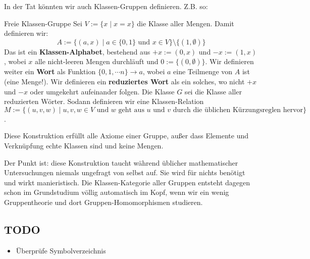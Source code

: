 \documentclass[a4paper]{amsart}
\theoremstyle{definition}
\begin{document}
In der Tat könnten wir auch Klassen-Gruppen definieren. Z.B. so:
\begin{Definition}{Freie Klassen-Gruppe}
   Sei $V := \{ x \mid x = x \}$ die Klasse aller Mengen. Damit definieren wir:
   \begin{equation}
      A := \{ (a, x ) \mid a \in \{0, 1\} \text{ und } x \in V \} \setminus \{ (1, \emptyset) \}
   \end{equation}
   Das ist ein \textbf{Klassen-Alphabet}, bestehend aus $+x := (0,x)$ und $-x := (1,x)$, wobei $x$ alle nicht-leeren Mengen durchläuft und $0 := \{(0, \emptyset)\}$.
   Wir definieren weiter ein \textbf{Wort} als Funktion $\{0, 1, \cdots n \} \to a$, wobei $a$ eine Teilmenge von $A$ ist (eine Menge!).
   Wir definieren ein \textbf{reduziertes Wort} als ein solches, wo nicht $+x$ und $-x$ oder umgekehrt aufeinander folgen.
   Die Klasse $G$ sei die Klasse aller reduzierten Wörter. Sodann definieren wir eine Klassen-Relation $M := \{ (u,v,w) \mid u,v,w \in V \text{ und $w$ geht aus $u$ und $v$ durch die üblichen Kürzungsreglen hervor}\}$.
\end{Definition}
Diese  Konstruktion erfüllt alle Axiome einer Gruppe, außer dass Elemente und Verknüpfung echte Klassen sind und keine Mengen.

Der Punkt ist: diese Konstruktion taucht während üblicher mathematischer Untersuchungen niemals ungefragt von selbst auf. Sie wird für nichts benötigt und wirkt manieristisch. 
Die Klassen-Kategorie aller Gruppen entsteht dagegen schon im Grundstudium völlig automatisch im Kopf, wenn wir ein wenig Gruppentheorie und dort Gruppen-Homomorphismen studieren.

\begin{backup}
\section{TODO}
\begin{itemize}
     \item Überprüfe Symbolverzeichnis
\end{itemize}


\end{backup}
\end{document}
